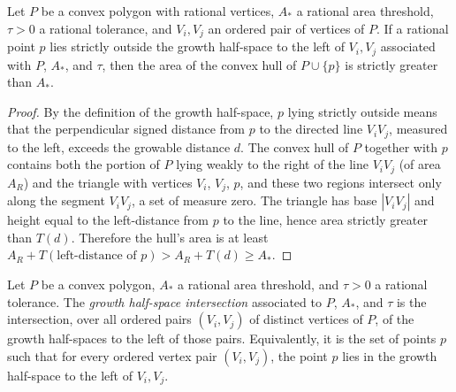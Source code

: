 \begin{lemma}
  \label{lem:threshold_violated_outside_growth_halfspace}
  Let $P$ be a convex polygon with rational vertices, $A_*$ a rational
  area threshold, $\tau > 0$ a rational tolerance, and $V_i, V_j$ an
  ordered pair of vertices of $P$. If a rational point $p$ lies
  strictly outside the growth half-space to the left of $V_i, V_j$
  associated with $P$, $A_*$, and $\tau$, then the area of the convex
  hull of $P \cup \{p\}$ is strictly greater than $A_*$.
\end{lemma}
\begin{proof}
  By the definition of the growth half-space, $p$ lying strictly
  outside means that the perpendicular signed distance from $p$ to the
  directed line $V_i V_j$, measured to the left, exceeds the growable
  distance $d$. The convex hull of $P$ together with $p$ contains both
  the portion of $P$ lying weakly to the right of the line $V_i V_j$
  (of area $A_R$) and the triangle with vertices $V_i$, $V_j$, $p$,
  and these two regions intersect only along the segment $V_i V_j$, a
  set of measure zero. The triangle has base $|V_i V_j|$ and height
  equal to the left-distance from $p$ to the line, hence area strictly
  greater than $T(d)$. Therefore the hull's area is at least
  $A_R + T(\text{left-distance of } p) > A_R + T(d) \ge A_*$.
\end{proof}

\begin{definition}
  \label{def:growthHalfspaceIntersection}
  Let $P$ be a convex polygon, $A_*$ a rational area threshold, and
  $\tau > 0$ a rational tolerance. The
  \emph{growth half-space intersection} associated to $P$, $A_*$, and
  $\tau$ is the intersection, over all ordered pairs $(V_i, V_j)$ of
  distinct vertices of $P$, of the growth half-spaces to the left of
  those pairs. Equivalently, it is the set of points $p$ such that for
  every ordered vertex pair $(V_i, V_j)$, the point $p$ lies in the
  growth half-space to the left of $V_i, V_j$.
\end{definition}

